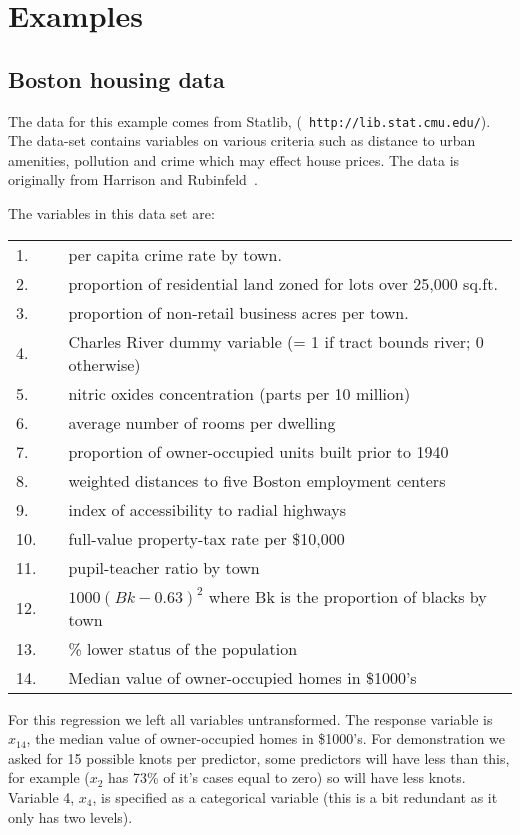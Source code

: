 \section{Examples}
\subsection{Boston housing data}
The data for this example comes from Statlib, ({\tt
http://lib.stat.cmu.edu/}). The data-set contains variables on various
criteria such as distance to urban amenities, pollution and crime which
may effect house prices. The data is originally from Harrison and Rubinfeld~\cite{H}. 

The  variables in this data set are:

\begin{tabular}{lll}
1. && per capita crime rate by town.\\
2. && proportion of residential land zoned for lots over 25,000 sq.ft.\\
3. && proportion of non-retail business acres per town.\\
4. && Charles River dummy variable (= 1 if tract bounds river; 0
otherwise)\\
5. && nitric oxides concentration (parts per 10 million)\\
6. && average number of rooms per dwelling\\
7. && proportion of owner-occupied units built prior to 1940\\
8. && weighted distances to five Boston employment centers\\
9. && index of accessibility to radial highways\\
10.&& full-value property-tax rate per \$10,000\\
11.&& pupil-teacher ratio by town\\
12.&& $1000(Bk - 0.63)^2$ where Bk is the proportion of blacks by town\\
13.&& \% lower status of the population\\
14.&& Median value of owner-occupied homes in \$1000's\\
\end{tabular}


For this regression we left all variables untransformed. The response
variable is $x_{14}$, the median value of owner-occupied homes in
\$1000's.
For demonstration we asked for 15 possible knots per predictor, some
predictors will have less than this, for example  ($x_2$ has 73\% of
it's cases equal to zero) so will have less knots. Variable 4, $x_4$, is
specified as a categorical variable (this is a bit redundant as it
only has two levels).

